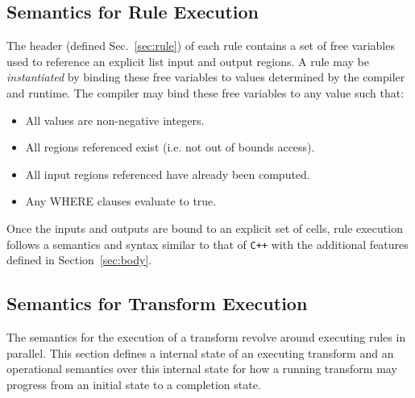 \documentclass[11pt]{article}
\begin{document}
\subsection{Semantics for Rule Execution}

The header (defined Sec.~\ref{sec:rule}) of each rule contains a set of
free variables used to reference an explicit list input and output regions.
A rule may be {\em instantiated} by binding these free variables to values
determined by the compiler and runtime.  The compiler may bind these free
variables to any value such that:
\begin{itemize}
\item All values are non-negative integers.
\item All regions referenced exist (i.e. not out of bounds access).
\item All input regions referenced have already been computed.
\item Any WHERE clauses evaluate to true.
\end{itemize}

Once the inputs and outputs are bound to an explicit set of cells, rule
execution follows a semantics and syntax similar to that of {\tt C++} with
the additional features defined in Section~\ref{sec:body}.


\subsection{Semantics for Transform Execution}

The semantics for the execution of a transform revolve around executing
rules in parallel.  This section defines a internal state of an executing
transform and an operational semantics over this internal state for how a
running transform may progress from an initial state to a completion state.
\end{document}
